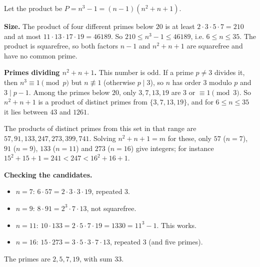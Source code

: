 Let the product be $P=n^3-1=(n-1)\left(n^2+n+1\right)$.

\textbf{Size.} The product of four different primes below $20$ is at least $2\cdot3\cdot5\cdot7=210$ and at most $11\cdot13\cdot17\cdot19=46189$. So $210\le n^3-1\le46189$, i.e. $6\le n\le35$. The product is squarefree, so both factors $n-1$ and $n^2+n+1$ are squarefree and have no common prime.

\textbf{Primes dividing $n^2+n+1$.} This number is odd. If a prime $p\ne3$ divides it, then $n^3\equiv1\pmod p$ but $n\not\equiv1$ (otherwise $p\mid3$), so $n$ has order $3$ modulo $p$ and $3\mid p-1$. Among the primes below $20$, only $3,7,13,19$ are $3$ or $\equiv1\pmod3$. So $n^2+n+1$ is a product of distinct primes from $\{3,7,13,19\}$, and for $6\le n\le35$ it lies between $43$ and $1261$.

The products of distinct primes from this set in that range are $57,91,133,247,273,399,741$. Solving $n^2+n+1=m$ for these, only $57$ ($n=7$), $91$ ($n=9$), $133$ ($n=11$) and $273$ ($n=16$) give integers; for instance $15^2+15+1=241<247<16^2+16+1$.

\textbf{Checking the candidates.}
\begin{itemize}
\item $n=7$: $6\cdot57=2\cdot3\cdot3\cdot19$, repeated $3$.
\item $n=9$: $8\cdot91=2^3\cdot7\cdot13$, not squarefree.
\item $n=11$: $10\cdot133=2\cdot5\cdot7\cdot19=1330=11^3-1$. This works.
\item $n=16$: $15\cdot273=3\cdot5\cdot3\cdot7\cdot13$, repeated $3$ (and five primes).
\end{itemize}
The primes are $2,5,7,19$, with sum $\boxed{33}$.
